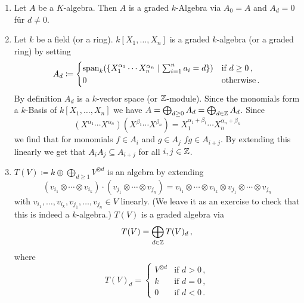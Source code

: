 \begin{expls}
  \begin{enumerate}[label=\emph{\alph*)},leftmargin=*]
    \item
      Let $A$ be a $K$-algebra.
      Then $A$ is a graded $k$-Algebra via $A_0 = A$ and $A_d = 0$ für $d \neq 0$.
    \item
      Let $k$ be a field (or a ring).
      $k[X_1, \dotsc, X_n]$ is a graded $k$-algebra (or a graded ring) by setting
      \[
                  A_d
        \coloneqq \begin{cases}
                    \operatorname{span}_k(
                              \{X_1^{\alpha_1} \dotsm X_n^{\alpha_n}
                            \mid
                              \sum_{i=1}^n a_i = d\}
                            )
                            & \text{if } d \geq 0 \,, \\
                    0       & \text{otherwise} \,.
                  \end{cases}
      \]
      By definition $A_d$ is a $k$-vector space (or $\mathbb{Z}$-module).
      Since the monomials form a $k$-Basis of $k[X_1, \dotsc, X_n]$ we have $A = \bigoplus_{d \geq 0} A_d = \bigoplus_{d \in \mathbb{Z}} A_d$.
      Since
      \[
          \left( X^{\alpha_1} \dotsm X^{\alpha_n} \right)
          \left( X^{\beta_1} \dotsm X^{\beta_n} \right)
        = X_1^{\alpha_1+\beta_1} \dotsm X_n^{\alpha_n+\beta_n}
      \]
      we find that for monomials $f \in A_i$ and $g \in A_j$ $fg \in A_{i+j}$.
      By extending this linearly we get that $A_i A_j \subseteq A_{i+j}$ for all $i,j \in \mathbb{Z}$.
    \item
      $T(V) \coloneqq k \oplus \bigoplus_{d \geq 1} V^{\otimes d}$ is an algebra by extending
      \[
          (v_{i_1} \otimes \dotsb \otimes v_{i_k}) \cdot (v_{j_1} \otimes \dotsb \otimes v_{j_n})
        = v_{i_1} \otimes \dotsb \otimes v_{i_k} \otimes v_{j_1} \otimes \dotsb \otimes v_{j_n}
      \]
      with $v_{i_1}, \dotsc, v_{i_k}, v_{j_1}, \dotsc, v_{j_n} \in V$ linearly.
      (We leave it as an exercise to check that this is indeed a $k$-algebra.)
      $T(V)$ is a graded algebra via
      \[
          T(V)
        = \bigoplus_{d \in \mathbb{Z}} T(V)_d \,,
      \]
      where
      \[
          T(V)_d
        = \begin{cases}
            V^{\otimes d} & \text{if } d > 0 \,,  \\
            k             & \text{if } d = 0 \,,  \\
            0             & \text{if } d < 0 \,.
          \end{cases}
      \]
  \end{enumerate}
\end{expls}


